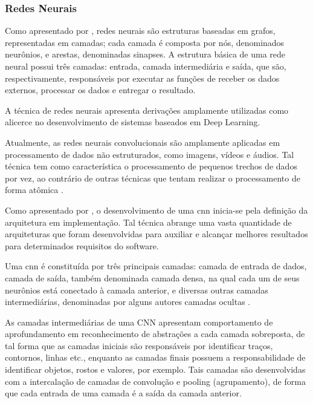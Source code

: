 \subsubsection{Redes Neurais}

Como apresentado por , 
redes neurais são estruturas baseadas em grafos, representadas em camadas; 
cada camada é composta por nós, denominados neurônios, e arestas, 
denominadas sinapses. A estrutura básica de uma rede neural possui três camadas: 
entrada, camada intermediária e saída, que são, respectivamente, responsáveis 
por executar as funções de receber os dados externos, 
processar os dados e entregar o resultado.

A técnica de redes neurais apresenta derivações amplamente utilizadas como alicerce 
no desenvolvimento de sistemas baseados em Deep Learning.


Atualmente, as redes neurais convolucionais são amplamente aplicadas em processamento de dados não estruturados, 
como imagens, vídeos e áudios. Tal técnica tem como característica o 
processamento de pequenos trechos de dados por vez, ao contrário 
de outras técnicas que tentam realizar o processamento de forma atômica 
\cite{jesus2023inteligencia}.

Como apresentado por , 
o desenvolvimento de uma \gls{cnn} inicia-se pela definição da arquitetura em implementação. 
Tal técnica abrange uma vasta quantidade de arquiteturas que foram 
desenvolvidas para auxiliar e alcançar melhores resultados para 
determinados requisitos do software.

Uma \gls{cnn} é constituída por três principais camadas: camada de entrada de dados, 
camada de saída, também denominada camada densa, 
na qual cada um de seus neurônios está conectado à camada anterior, e diversas outras 
camadas intermediárias, 
denominadas por alguns autores camadas ocultas \cite{ayeni2022convolutional}. 

As camadas intermediárias de uma CNN 
apresentam comportamento de aprofundamento em reconhecimento de abstrações a cada camada sobreposta, 
de tal forma que as camadas iniciais são responsáveis por identificar traços, 
contornos, linhas etc., 
enquanto as camadas finais possuem a responsabilidade de identificar objetos, 
rostos e valores, por exemplo. 
Tais camadas são desenvolvidas com a intercalação de camadas de convolução e pooling (agrupamento), 
de forma que cada entrada de uma camada é a saída da camada anterior.

